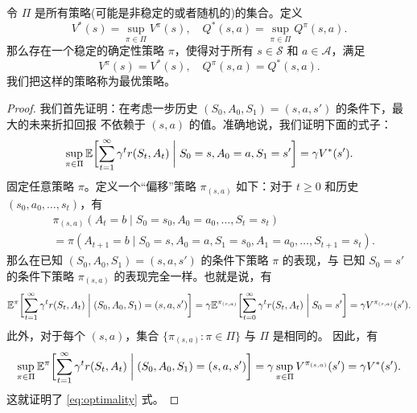 \documentclass[fontset=none,zihao=-4]{Notes}
\begin{document}
\begin{theorem}
  令 $\Pi$ 是所有策略(可能是非稳定的或者随机的)的集合。定义
  \[
    V^*(s) = \sup_{\pi\in \Pi} V^\pi(s),\quad Q^*(s,a) = \sup_{\pi\in \Pi} Q^\pi(s,a).
  \]
  那么存在一个稳定的确定性策略 $\pi$，使得对于所有 $s\in \mathcal S$ 和 $a\in \mathcal A$，满足 
  \[
    V^\pi(s) = V^*(s),\quad Q^\pi(s,a)=Q^*(s,a).
  \]
  我们把这样的策略称为最优策略。
\end{theorem}
\begin{proof}
  我们首先证明：在考虑一步历史 $(S_0,A_0,S_1)=(s,a,s')$ 的条件下，最大的未来折扣回报
  不依赖于 $(s,a)$ 的值。准确地说，我们证明下面的式子：
  \begin{equation}\label{eq:optimality}
    \sup_{\pi\in \Pi} \mathbb{E}\biggl[
      \sum_{t=1}^\infty \gamma^t r(S_t,A_t) \biggm| S_0=s, A_0=a, S_1=s'
    \biggr]=\gamma V^*(s').
  \end{equation}
  固定任意策略 $\pi$。定义一个“偏移”策略 $\pi_{(s,a)}$ 如下：对于 $t\geq 0$ 和历史 $(s_0,a_0,\dots,s_t)$，有
  \begin{align*}
    &\pi_{(s,a)}(A_t=b\mid S_0=s_0,A_0=a_0,\dots,S_t=s_t)\\&=
    \pi(A_{t+1}=b\mid S_0=s,A_0=a,S_1=s_0,A_1=a_0,\dots,S_{t+1}=s_t).
  \end{align*}
  那么在已知 $(S_0,A_0,S_1)=(s,a,s')$ 的条件下策略 $\pi$ 的表现，与
  已知 $S_0=s'$ 的条件下策略 $\pi_{(s,a)}$ 的表现完全一样。也就是说，有
  \[
    \mathbb{E}^\pi \biggl[
      \sum_{t=1}^\infty \gamma^t r(S_t,A_t) \biggm| (S_0,A_0,S_1)=(s,a,s')
    \biggr] = \gamma \mathbb{E}^{\pi_{(s,a)}} \biggl[
      \sum_{t=0}^\infty \gamma^t r(S_t,A_t) \biggm| S_0=s'
    \biggr]=\gamma V^{\pi_{(s,a)}}(s').
  \]
  此外，对于每个 $(s,a)$，集合 $\{\pi_{(s,a)} : \pi \in \Pi\}$ 与 $\Pi$ 是相同的。
  因此，有
  \[
    \sup_{\pi\in \Pi} \mathbb{E}^\pi \biggl[
      \sum_{t=1}^\infty \gamma^t r(S_t,A_t) \biggm| (S_0,A_0,S_1)=(s,a,s')
    \biggr] = \gamma \sup_{\pi\in \Pi} V^{\pi_{(s,a)}}(s') = \gamma V^*(s').
  \]
  这就证明了 \eqref{eq:optimality} 式。


\end{proof}









\end{document}
